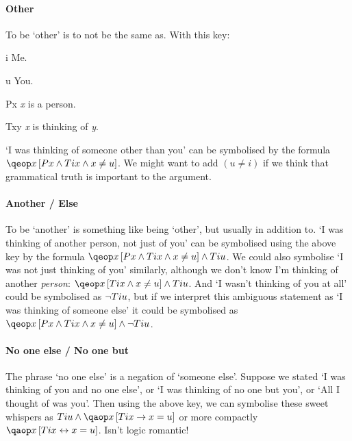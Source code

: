 \documentclass[PHIL101-Textbook.tex]{subfiles}
\begin{document}
\paragraph{Other} 
To be `other' is to not be the same as. With this key:
\begin{ekey}
\item[i] Me.
\item[u] You.
\item[Px] \textit{x} is a person.
\item[Txy] \textit{x} is thinking of \textit{y}.
\end{ekey}

`I was thinking of someone other than you' can be symbolised by the formula $\qeb{x}{Px \eand Tix \eand x \neq u}$. We might want to add $(u \neq i)$ if we think that grammatical truth is important to the argument.


\pagebreak

\paragraph{Another / Else} 
To be `another' is something like being `other', but usually in addition to. `I was thinking of another person, not just of you' can be symbolised using the above key by the formula $\qeb{x}{Px \eand Tix \eand x \neq u} \eand Tiu$. We could also symbolise `I was not just thinking of you' similarly, although we don't know I'm thinking of another \textit{person}: $\qeb{x}{Tix \eand x \neq u} \eand Tiu$. And `I wasn't thinking of you at all' could be symbolised as $\neg Tiu$, but if we interpret this ambiguous statement as `I was thinking of someone else' it could be symbolised as $\qeb{x}{Px \eand Tix \eand x \neq u} \eand \enot Tiu$. 



\paragraph{No one else / No one but}
The phrase `no one else' is a negation of `someone else'. Suppose we stated `I was thinking of you and no one else', or `I was thinking of no one but you', or `All I thought of was you'. Then using the above key, we can symbolise these sweet whispers as $Tiu \eand \qab{x}{Tix \eif x = u}$ or more compactly $\qab{x}{Tix \eiff x = u}$. Isn't logic romantic!
\end{document}
